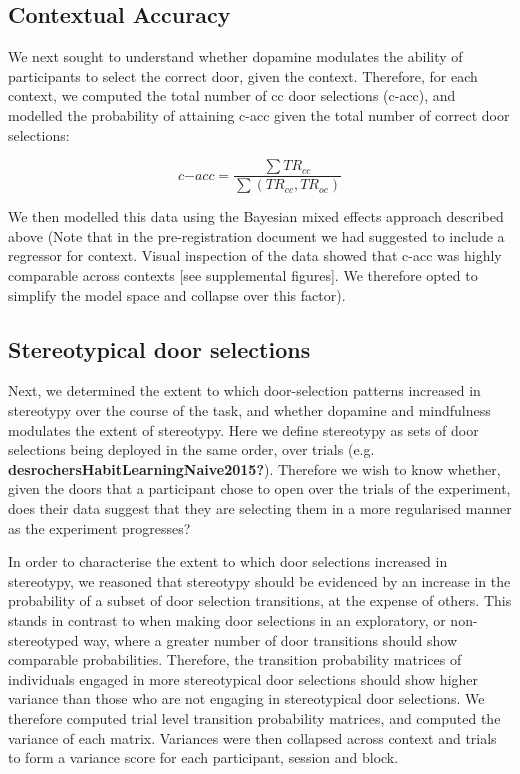 \documentclass{article}
\begin{document}
\hypertarget{contextual-accuracy}{%
\subsection{Contextual Accuracy}\label{contextual-accuracy}}

We next sought to understand whether dopamine modulates the ability of
participants to select the correct door, given the context. Therefore,
for each context, we computed the total number of cc door selections
(c-acc), and modelled the probability of attaining c-acc given the total
number of correct door selections:

\[
c\mathrm{-}acc = \frac{\sum{TR_{cc}}}{\sum{(TR_{cc}, TR_{oc})}}
\]

We then modelled this data using the Bayesian mixed effects approach
described above (Note that in the pre-registration document we had
suggested to include a regressor for context. Visual inspection of the
data showed that c-acc was highly comparable across contexts {[}see
supplemental figures{]}. We therefore opted to simplify the model space
and collapse over this factor).

\hypertarget{stereotypical-door-selections}{%
\subsection{Stereotypical door
selections}\label{stereotypical-door-selections}}

Next, we determined the extent to which door-selection patterns
increased in stereotypy over the course of the task, and whether
dopamine and mindfulness modulates the extent of stereotypy. Here we
define stereotypy as sets of door selections being deployed in the same
order, over trials (e.g. \textbf{desrochersHabitLearningNaive2015?}).
Therefore we wish to know whether, given the doors that a participant
chose to open over the trials of the experiment, does their data suggest
that they are selecting them in a more regularised manner as the
experiment progresses?

In order to characterise the extent to which door selections increased
in stereotypy, we reasoned that stereotypy should be evidenced by an
increase in the probability of a subset of door selection transitions,
at the expense of others. This stands in contrast to when making door
selections in an exploratory, or non-stereotyped way, where a greater
number of door transitions should show comparable probabilities.
Therefore, the transition probability matrices of individuals engaged in
more stereotypical door selections should show higher variance than
those who are not engaging in stereotypical door selections. We
therefore computed trial level transition probability matrices, and
computed the variance of each matrix. Variances were then collapsed
across context and trials to form a variance score for each participant,
session and block.
\end{document}
